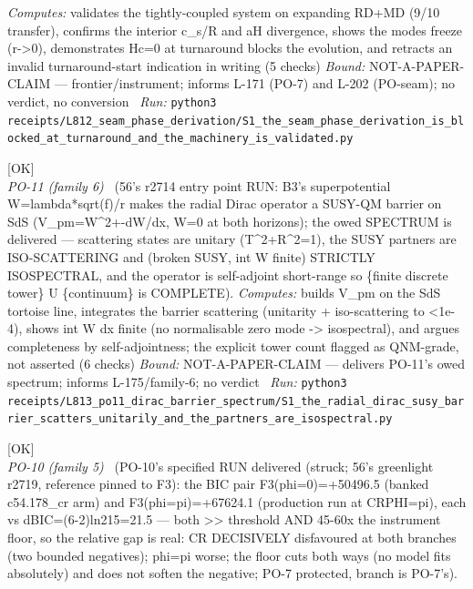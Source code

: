 \begin{description}
\emph{Computes:} validates the tightly-coupled system on expanding RD+MD (9/10 transfer), confirms the interior c\_s/R and \textbar{}aH\textbar{} divergence, shows the modes freeze (r->0), demonstrates Hc=0 at turnaround blocks the evolution, and retracts an invalid turnaround-start indication in writing (5 checks)
 \emph{Bound:} NOT-A-PAPER-CLAIM --- frontier/instrument; informs L-171 (PO-7) and L-202 (PO-seam); no verdict, no conversion
\ \emph{Run:} \texttt{python3 receipts/L812\_seam\_phase\_derivation/S1\_the\_seam\_phase\_derivation\_is\_blocked\_at\_turnaround\_and\_the\_machinery\_is\_validated.py}
\item[\label{rcpt:S1_the_radial_dirac_susy_barrier_scatters_unitarily_and_the_partners_are_isospectral}\texttt{S1\_the\_radial\_dirac\_susy\_barrier\_scatters\_unitarily\_and\_the\_partners\_are\_isospectral}]\hfill\textsf{[OK]}\\
\textit{PO-11 (family 6)} \ (56's r2714 entry point RUN: B3's superpotential W=lambda*sqrt(f)/r makes the radial Dirac operator a SUSY-QM barrier on SdS (V\_pm=W\textasciicircum{}2+-dW/dx, W=0 at both horizons); the owed SPECTRUM is delivered --- scattering states are unitary (\textbar{}T\textbar{}\textasciicircum{}2+\textbar{}R\textbar{}\textasciicircum{}2=1), the SUSY partners are ISO-SCATTERING and (broken SUSY, int W finite) STRICTLY ISOSPECTRAL, and the operator is self-adjoint short-range so \{finite discrete tower\} U \{continuum\} is COMPLETE). 
\emph{Computes:} builds V\_pm on the SdS tortoise line, integrates the barrier scattering (unitarity + iso-scattering to <1e-4), shows int W dx finite (no normalisable zero mode -> isospectral), and argues completeness by self-adjointness; the explicit tower count flagged as QNM-grade, not asserted (6 checks)
 \emph{Bound:} NOT-A-PAPER-CLAIM --- delivers PO-11's owed spectrum; informs L-175/family-6; no verdict
\ \emph{Run:} \texttt{python3 receipts/L813\_po11\_dirac\_barrier\_spectrum/S1\_the\_radial\_dirac\_susy\_barrier\_scatters\_unitarily\_and\_the\_partners\_are\_isospectral.py}
\item[\label{rcpt:S1_the_bic_pair_is_delivered_and_CR_is_not_preferred_at_either_seam_phase}\texttt{S1\_the\_bic\_pair\_is\_delivered\_and\_CR\_is\_not\_preferred\_at\_either\_seam\_phase}]\hfill\textsf{[OK]}\\
\textit{PO-10 (family 5)} \ (PO-10's specified RUN delivered (struck; 56's greenlight r2719, reference pinned to F3): the BIC pair F3(phi=0)=+50496.5 (banked c54.178\_cr arm) and F3(phi=pi)=+67624.1 (production run at CRPHI=pi), each vs dBIC=(6-2)ln215=21.5 --- both >> threshold AND 45-60x the instrument floor, so the relative gap is real: CR DECISIVELY disfavoured at both branches (two bounded negatives); phi=pi worse; the floor cuts both ways (no model fits absolutely) and does not soften the negative; PO-7 protected, branch is PO-7's). 

\end{description}
